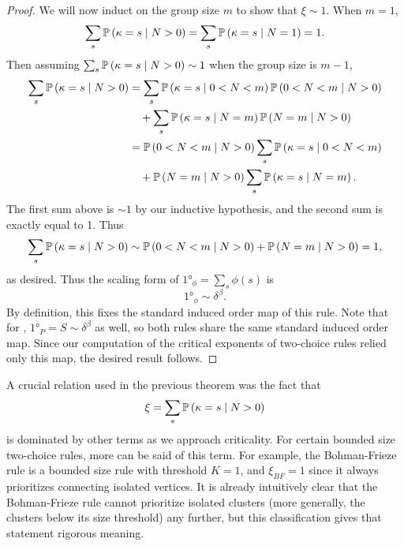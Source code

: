 \documentclass[twoside,10pt]{article}
\newcommand{\BF}{Bohman-Frieze\xspace}
\begin{document}
\begin{proof}
	We will now induct on the group size $m$ to show that $\xi \sim 1$. When $m=1$,
	\[
	\sum_{s} \P{ \kappa=s\;|\; N>0 } = \sum_{s}\P{ \kappa=s\;|\; N=1 } = 1.
	\] Then assuming $\sum_{s} \P{ \kappa=s\;|\; N>0 } \sim 1$ when the group size is $m-1$,
	\begin{align*}
		\sum_{s}\P{ \kappa=s\;|\; N>0 } &= \sum_{s}\P{ \kappa=s\;|\; 0<N<m }\P{ 0<N<m\;|\;N>0 } \\
							 &\quad + \sum_{s} \P{ \kappa=s\;|\; N=m }\P{ N=m\;|\;N>0 } \\
							 &= \P{ 0<N<m\;|\; N>0 } \sum_{s} \P{ \kappa=s\;|\; 0<N<m } \\
							 &\quad + \P{ N=m\;|\;N>0 }\sum_{s}\P{ \kappa=s\;|\; N=m }.
	\end{align*}
	The first sum above is $\sim 1$ by our inductive hypothesis, and the second sum is exactly equal to 1. Thus
	\[
		\sum_{s}\P{ \kappa=s\;|\; N>0 } \sim \P{ 0<N<m\;|\; N>0 } + \P{ N=m\;|\;N>0 } = 1,
	\]
	as desired. Thus the scaling form of $\ang{1}_{\phi}=\sum_{s}\phi(s)$ is
	\[
	\ang{1}_{\phi} \sim \delta^{\beta}.
	\] 
	By definition, this fixes the standard induced order map of this rule. 	Note that for \ER, $\ang{1}_{P} = S \sim \delta^{\beta}$ as well, so both rules share the same standard induced order map. Since our computation of the critical exponents of two-choice rules relied only this map, the desired result follows.
\end{proof}

A crucial relation used in the previous theorem was the fact that
\[
\xi = \sum_{s} \P{ \kappa=s\;|\; N>0 }
\] is dominated by other terms as we approach criticality. For certain bounded size two-choice rules, more can be said of this term. For example, the \BF rule is a bounded size rule with threshold $K=1$, and $\xi_{BF}= 1$ since it always prioritizes connecting isolated vertices. It is already intuitively clear that the \BF rule cannot prioritize isolated clusters (more generally, the clusters below its size threshold) any further, but this classification gives that statement rigorous meaning.


\printbibliography
\end{document}
